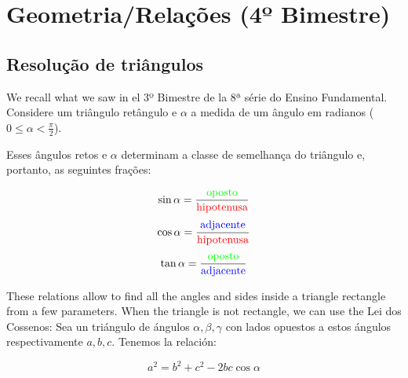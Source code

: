 \chapter{Geometria/Relações (4º Bimestre)}

\section{Resolução de triângulos}

We recall what we saw in el 3º Bimestre de la 8ª série do Ensino Fundamental.
Considere um triângulo retângulo e $\alpha$ a medida de um ângulo
em radianos ($0 \leq \alpha < \frac{\pi}{2}$).

\begin{center}
\end{center}

Esses ângulos retos e $\alpha$ determinam a classe de semelhança do triângulo
e, portanto, as seguintes frações:

$$
\sin \alpha = \frac{\color{green}{\text{oposto}}}
{\text{\color{red}{\text{hipotenusa}}}}
$$
$$
\cos \alpha = \frac{\color{blue}{\text{adjacente}}}
{\text{\color{red}{\text{hipotenusa}}}}
$$
$$
\tan \alpha = \frac{\color{green}{\text{oposto}}}
{\text{\color{blue}{\text{adjacente}}}}
$$

These relations allow to find all the angles and sides inside a triangle
rectangle from a few parameters. When the triangle is not rectangle,
we can use the Lei dos Cossenos: Sea un triángulo de ángulos
$\alpha, \beta, \gamma$ con lados opuestos a estos
ángulos respectivamente $a,b,c$. Tenemos la relación:

$$a^2 = b^2 + c^2 - {2bc \cos\alpha}$$

\begin{center}
\end{center}

